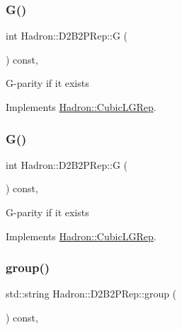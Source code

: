 \subsubsection{\texorpdfstring{G()}{G()}\hspace{0.1cm}{\footnotesize\ttfamily [2/3]}}
{\footnotesize\ttfamily int Hadron\+::\+D2\+B2\+P\+Rep\+::G (\begin{DoxyParamCaption}{ }\end{DoxyParamCaption}) const\hspace{0.3cm}{\ttfamily [inline]}, {\ttfamily [virtual]}}

G-\/parity if it exists 

Implements \mbox{\hyperlink{structHadron_1_1CubicLGRep_ace26f7b2d55e3a668a14cb9026da5231}{Hadron\+::\+Cubic\+L\+G\+Rep}}.

\mbox{\label{structHadron_1_1D2B2PRep_a618a8eb583b83a0dca1bcc219f71e5e7}} 
\subsubsection{\texorpdfstring{G()}{G()}\hspace{0.1cm}{\footnotesize\ttfamily [3/3]}}
{\footnotesize\ttfamily int Hadron\+::\+D2\+B2\+P\+Rep\+::G (\begin{DoxyParamCaption}{ }\end{DoxyParamCaption}) const\hspace{0.3cm}{\ttfamily [inline]}, {\ttfamily [virtual]}}

G-\/parity if it exists 

Implements \mbox{\hyperlink{structHadron_1_1CubicLGRep_ace26f7b2d55e3a668a14cb9026da5231}{Hadron\+::\+Cubic\+L\+G\+Rep}}.

\mbox{\label{structHadron_1_1D2B2PRep_a5e6b85d31dc1c9bec4956b4c6bccd01e}} 
\subsubsection{\texorpdfstring{group()}{group()}\hspace{0.1cm}{\footnotesize\ttfamily [1/3]}}
{\footnotesize\ttfamily std\+::string Hadron\+::\+D2\+B2\+P\+Rep\+::group (\begin{DoxyParamCaption}{ }\end{DoxyParamCaption}) const\hspace{0.3cm}{\ttfamily [inline]}, {\ttfamily [virtual]}}

